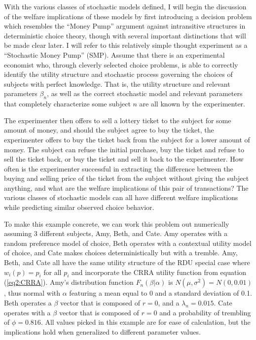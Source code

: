 \documentclass[../main.tex]{subfiles}
\begin{document}
With the various classes of stochastic models defined, I will begin the discussion of the welfare implications of these models by first introducing a decision problem which resembles the \enquote{Money Pump} argument against intransitive structures in deterministic choice theory, though with several important distinctions that will be made clear later.
I will refer to this relatively simple thought experiment as a \enquote{Stochastic Money Pump} (SMP).
Assume that there is an experimental economist who, through cleverly selected choice problems, is able to correctly identify the utility structure and stochastic process governing the choices of subjects with perfect knowledge.
That is, the utility structure and relevant parameters $\beta_n$, as well as the correct stochastic model and relevant parameters that completely characterize some subject $n$ are all known by the experimenter.

The experimenter then offers to sell a lottery ticket to the subject for some amount of money, and should the subject agree to buy the ticket, the experimenter offers to buy the ticket back from the subject for a lower amount of money.
The subject can refuse the initial purchase, buy the ticket and refuse to sell the ticket back, or buy the ticket and sell it back to the experimenter.
How often is the experimenter successful in extracting the difference between the buying and selling price of the ticket from the subject without giving the subject anything, and what are the welfare implications of this pair of transactions?
The various classes of stochastic models can all have different welfare implications while predicting similar observed choice behavior.

To make this example concrete, we can work this problem out numerically assuming 3 different subjects, Amy, Beth, and Cate.
Amy operates with a random preference model of choice, Beth operates with a contextual utility model of choice, and Cate makes choices deterministically but with a tremble.
Amy, Beth, and Cate all have the same utility structure of the RDU special case where $w_i(p)=p_i$ for all $p_i$ and incorporate the CRRA utility function from equation (\ref{eq2:CRRA}).
Amy's distribution function $F_n(\beta|\alpha)$ is $N(\mu,\sigma^2) = N(0,0.01)$, thus normal with $\alpha$ featuring a mean equal to 0 and a standard deviation of 0.1.
Beth operates a $\beta$ vector that is composed of $r=0$, and a $\lambda_n = 0.015$.
Cate operates with a $\beta$ vector that is composed of $r=0$ and a probability of trembling of $\phi = 0.816$.
All values picked in this example are for ease of calculation, but the implications hold when generalized to different parameter values.
\end{document}
